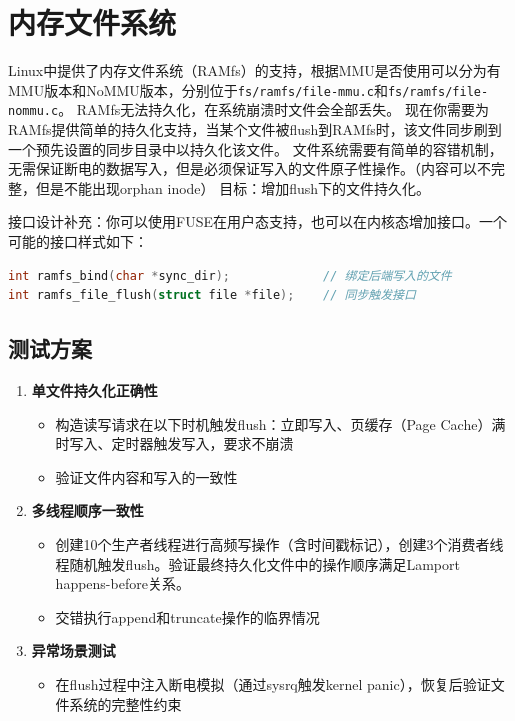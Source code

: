 \section{内存文件系统}
Linux中提供了内存文件系统（RAMfs）的支持，根据MMU是否使用可以分为有MMU版本和NoMMU版本，分别位于\texttt{fs/ramfs/file-mmu.c}和\texttt{fs/ramfs/file-nommu.c}。
RAMfs无法持久化，在系统崩溃时文件会全部丢失。
现在你需要为RAMfs提供简单的持久化支持，当某个文件被flush到RAMfs时，该文件同步刷到一个预先设置的同步目录中以持久化该文件。
文件系统需要有简单的容错机制，无需保证断电的数据写入，但是必须保证写入的文件原子性操作。（内容可以不完整，但是不能出现orphan inode）
目标：增加flush下的文件持久化。

接口设计补充：你可以使用FUSE在用户态支持，也可以在内核态增加接口。一个可能的接口样式如下：
\begin{lstlisting}[language=C]
int ramfs_bind(char *sync_dir);             // 绑定后端写入的文件
int ramfs_file_flush(struct file *file);    // 同步触发接口
\end{lstlisting}


\subsection*{测试方案}
\begin{enumerate}
    \item \textbf{单文件持久化正确性}
    \begin{itemize}
        \item 构造读写请求在以下时机触发flush：立即写入、页缓存（Page Cache）满时写入、定时器触发写入，要求不崩溃
        \item 验证文件内容和写入的一致性
    \end{itemize}
    
    \item \textbf{多线程顺序一致性}
    \begin{itemize}
        \item 创建10个生产者线程进行高频写操作（含时间戳标记），创建3个消费者线程随机触发flush。验证最终持久化文件中的操作顺序满足Lamport happens-before关系。
        \item 交错执行append和truncate操作的临界情况
    \end{itemize}
    
    \item \textbf{异常场景测试}
    \begin{itemize}
        \item 在flush过程中注入断电模拟（通过sysrq触发kernel panic），恢复后验证文件系统的完整性约束
    \end{itemize}
\end{enumerate}




